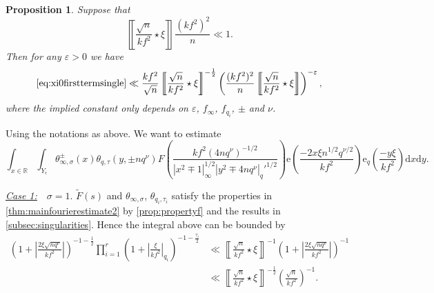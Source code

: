 \documentclass[10pt,oneside,reqno]{amsart}
\makeatletter
\newcommand\rmd{\mathrm{d}}
\newcommand\rme{\mathrm{e}}
\newcommand\RR{\mathbb{R}}
\newcommand\legendresymbol[2]{\genfrac{(}{)}{}{}{#1}{#2}}
\theoremstyle{THEOREM}
\newtheorem{proposition}[theorem]{Proposition}
\theoremstyle{DEFINITION}
\theoremstyle{EXERCISE}
\numberwithin{equation}{section}
\renewenvironment{proof}[1][\proofname]{\par
  \vspace{-6pt}
  \pushQED{\qed}
  \normalfont \topsep6\p@\@plus6\p@\relax
  \trivlist
  \item[\hskip\labelsep\rmfamily\bfseries
    #1\@addpunct{:}]\ignorespaces
}{
  \popQED\endtrivlist\@endpefalse
  \vspace{-6pt}
}
\makeatother
\begin{document}
\begin{proposition}\label{prop:xi0firstterm2}
Suppose that 
\[
\left\llbracket\frac{\sqrt{n}}{kf^2}\star \xi\right\rrbracket\frac {(kf^2)^2}{n} \ll 1.
\]
Then for any $\varepsilon>0$ we have
\[
\eqref{eq:xi0firsttermsingle}\ll \frac{kf^2}{\sqrt{n}}\left\llbracket\frac{\sqrt{n}}{kf^2}\star \xi\right\rrbracket^{-\frac12}\left(\frac{(kf^2)^2}{n}\left\llbracket\frac{\sqrt{n}}{kf^2}\star \xi\right\rrbracket\right)^{-\varepsilon},
\]
where the implied constant only depends on $\varepsilon$, $f_\infty$, $f_{q_i}$, $\pm$ and $\nu$.
\end{proposition}
\begin{proof}
Using the notations as above. We want to estimate 
\[
\int_{x\in\RR}\int_{Y_\epsilon}\theta_{\infty,\sigma}^\pm(x)\theta_{q,\tau}(y,\pm nq^\nu) F\legendresymbol{kf^2(4nq^\nu)^{-1/2}}{|x^2\mp 1|_\infty^{1/2}|y^2\mp 4nq^\nu|_q'^{1/2}} \rme\legendresymbol{-2x\xi n^{1/2}q^{\nu/2}}{kf^2}\rme_{q}\legendresymbol{-y\xi}{kf^2}\rmd x\rmd y.
\]

\underline{\emph{Case 1:}}\ \ $\sigma=1$.
$\widetilde{F}(s)$ and $\theta_{\infty,\sigma}$, $\theta_{q_i,\tau_i}$ satisfy the properties in \autoref{thm:mainfourierestimate2} by \autoref{prop:propertyf} and the results in \autoref{subsec:singularities}. Hence the integral above can be bounded by
\begin{align*}
\left(1+\left|\frac{2\xi\sqrt{nq^\nu}}{kf^2}\right|\right)^{-1-\frac{1}{2}} \prod_{i=1}^{r}\left(1+\left|\frac{\xi}{kf^2}\right|_{q_i}\right)^{-1-\frac{\tau_i}{2}}&\ll \left\llbracket\frac{\sqrt{n}}{kf^2}\star \xi\right\rrbracket^{-1}
\left(1+\left|\frac{2\xi\sqrt{nq^\nu}}{kf^2}\right|\right)^{-1}\\
&\ll \left\llbracket\frac{\sqrt{n}}{kf^2}\star \xi\right\rrbracket^{-\frac12}\left(\frac{\sqrt{n}}{kf^2}\right)^{-1}.
\end{align*}


\end{proof}
\end{document}
